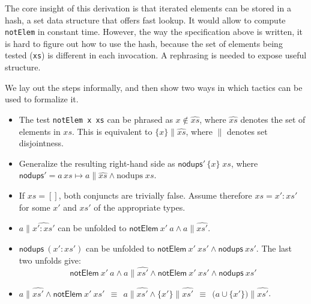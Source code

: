 The core insight of this derivation is that iterated elements can be stored
in a hash, a set data structure that offers fast lookup.
It would allow to compute \lstinline!notElem! in constant time.
However, the way the specification above is written, it is hard to figure out
how to use the hash, because the set of elements being tested (\lstinline!xs!)
is different in each invocation.
A rephrasing is needed to expose useful structure.

We lay out the steps informally, and then show two ways in which \TransCal
tactics can be used to formalize it.

\newcommand\symvar[1]{\mathit{#1}}
\newcommand\symfun[1]{\mathsf{#1}}
\newcommand\xs{\symvar{xs}}
\newcommand\nodups{\symfun{nodups}}
\newcommand\notElem{\symfun{notElem}}
\newcommand\elem{\symfun{elem}}

\begin{itemize}
\item
The test \lstinline!notElem x xs!
can be phrased as $x \not\in \widehat{\xs}$, where $\widehat{\xs}$ denotes
the set of elements in $xs$.
This is equivalent to $\{x\} \parallel \widehat{\xs}$, where $\parallel$
denotes set disjointness.
\item
Generalize the resulting right-hand side as $\nodups' \, \{x\} \; \xs$,
  where $\nodups' = a\,\xs \mapsto a\parallel\widehat{\xs} \land \mathrm{nodups}\;\xs$.
\item 
If $xs=[]$, both conjuncts are trivially false.
Assume therefore $\xs = x' : \xs'$ for some $x'$ and $\xs'$ of the appropriate
types.
\item
$a \parallel \widehat{x':\xs'}$ can be unfolded to
$\notElem~x'~a \land a \parallel \widehat{\xs'}$.
\item $\nodups~(x':\xs')$ can be unfolded to
$\notElem~x'~\xs' \land \nodups~\xs'$. The last two unfolds give:
\[\notElem~x'~a \land a \parallel \widehat{\xs'} \land
  \notElem~x'~\xs' \land \nodups~\xs'\]
\item $a \parallel \widehat{\xs'} \land
  \notElem~x'~\xs' 
  ~~\equiv~~
  a \parallel \widehat{\xs'} \land
  \{x'\} \parallel \widehat{\xs'}
  ~~\equiv~~
  \big(a \cup \{x'\}\big) \parallel \widehat{xs'}$.
\end{itemize}

